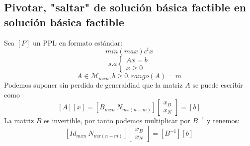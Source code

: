 \subsection{Pivotar, "saltar" de solución básica factible en solución básica factible}
Sea $[P]$ un PPL en formato estándar:
$$ min(max) c^t x$$
$$
s.a \left\{
  \begin{array}{c}
    Ax=b \\
    x \geq 0
  \end{array}
\right.
$$
$$ A \in \mathcal{M}_{mxn}, b\geq 0, rango(A)=m$$
Podemos suponer sin perdida de generaldiad que la matriz $A$ se puede
escribir como $$[A][x]=[B_{mxn} ~ N_{mx(n-m)}]
\left[
  \begin{array}{c}
    x_B \\
    x_N
  \end{array}
\right]=[b]$$
La matriz $B$ es invertible, por tanto podemos multiplicar por $B^{-1}$ y tenemos:
$$[Id_{mxn} ~ N_{mx(n-m)}]
\left[
  \begin{array}{c}
    x_B \\
    x_N
  \end{array}
\right]=[B^{-1}][b]$$
